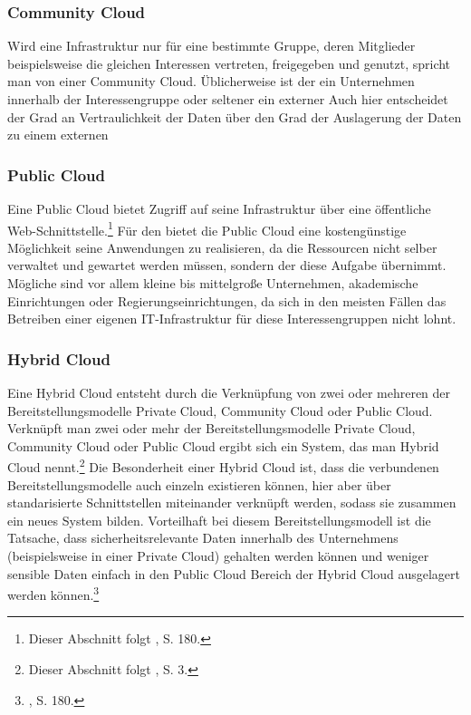 \subsubsection{Community Cloud}
Wird eine \CC Infrastruktur nur für eine bestimmte Gruppe, deren Mitglieder beispielsweise die gleichen Interessen vertreten, freigegeben und genutzt, spricht man von einer Community Cloud. Üblicherweise ist der \CSP ein Unternehmen innerhalb der Interessengruppe oder seltener ein externer \CSPDot Auch hier entscheidet der Grad an Vertraulichkeit der Daten über den Grad der Auslagerung der Daten zu einem externen \CSPDot

\subsubsection{Public Cloud}
Eine Public Cloud bietet Zugriff auf seine \CC Infrastruktur über eine öffentliche Web-Schnittstelle.\footnote{Dieser Abschnitt folgt \cite{Marston.2011}, S. 180.} Für den \CSU bietet die Public Cloud eine kostengünstige Möglichkeit seine Anwendungen zu realisieren, da die Ressourcen nicht selber verwaltet und gewartet werden müssen, sondern der \CSP diese Aufgabe übernimmt. Mögliche \CSU sind vor allem kleine bis mittelgroße Unternehmen, akademische Einrichtungen oder Regierungseinrichtungen, da sich in den meisten Fällen das Betreiben einer eigenen IT-Infrastruktur für diese Interessengruppen nicht lohnt.

\subsubsection{Hybrid Cloud}
Eine Hybrid Cloud entsteht durch die Verknüpfung von zwei oder mehreren der Bereitstellungsmodelle Private Cloud, Community Cloud oder Public Cloud.
Verknüpft man zwei oder mehr der Bereitstellungsmodelle Private Cloud, Community Cloud oder Public Cloud ergibt sich ein System, das man Hybrid Cloud nennt.\footnote{Dieser Abschnitt folgt \cite{Mell.2011}, S. 3.}
Die Besonderheit einer Hybrid Cloud ist, dass die verbundenen Bereitstellungsmodelle auch einzeln existieren können, hier aber über standarisierte Schnittstellen miteinander verknüpft werden, sodass sie zusammen ein neues \CC System bilden.
Vorteilhaft bei diesem Bereitstellungsmodell ist die Tatsache, dass sicherheitsrelevante Daten innerhalb des Unternehmens (beispielsweise in einer Private Cloud) gehalten werden können und weniger sensible Daten einfach in den Public Cloud Bereich der Hybrid Cloud ausgelagert werden können.\footnote{\cite{Marston.2011}, S. 180.}

